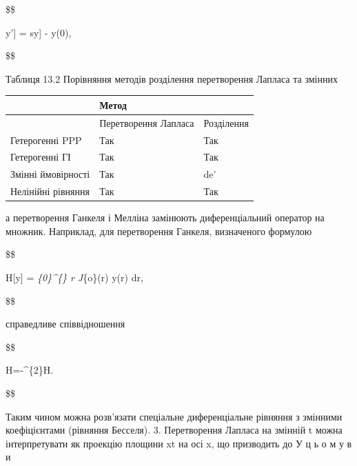 \documentclass[
  ukrainian,
]{article}
\newcounter{none} %
\begin{document}
\$\$

\mathscr{L}{[}y'{]} = s\mathscr{L}{[}y{]} - y(0),

\$\$

Таблиця 13.2 Порівняння методів розділення перетворення Лапласа та
змінних

{\def\LTcaptype{none} %
\begin{longtable}[]{@{}
  >{\raggedright\arraybackslash}p{}
  >{\raggedright\arraybackslash}p{}
  >{\raggedright\arraybackslash}p{}@{}}
\toprule\noalign{}
\begin{minipage}[b]{\linewidth}\raggedright
\end{minipage} & \begin{minipage}[b]{\linewidth}\raggedright
Метод
\end{minipage} & \begin{minipage}[b]{\linewidth}\raggedright
\end{minipage} \\
\midrule\noalign{}
\endhead
\bottomrule\noalign{}
\endlastfoot
& Перетворення Лапласа & Розділення \\
Гетерогенні PPP & Так & Так \\
Гетерогенні ГІ & Так & Так \\
Змінні ймовірності & Так & de' \\
Нелінійні рівняння & Так & Так \\
\end{longtable}
}

а перетворення Ганкеля і Мелліна замінюють диференціальний оператор на
множник. Наприклад, для перетворення Ганкеля, визначеного формулою

\$\$

H{[}y{]} = \int\emph{\{0\}\^{}\{\infty\} r J}\{o\}(\xi r) y(r) dr,

\$\$

справедливе співвідношення

\$\$

H=-\xi\^{}\{2\}H\left[y\right].

\$\$

Таким чином можна розв'язати спеціальне диференціальне рівняння з
змінними коефіцієнтами (рівняння Бесселя). 3. Перетворення Лапласа на
змінній t можна інтерпретувати як проекцію площини xt на осі x, що
призводить до У ц ь о м у в и
\end{document}
